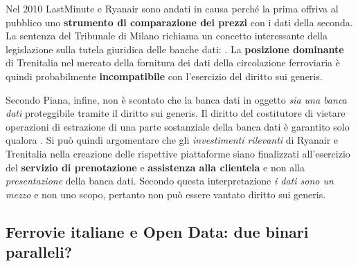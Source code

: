 \documentclass[12pt,a4paper,italian]{report}
\begin{document}
Nel 2010 LastMinute e Ryanair sono andati in causa perché la prima
offriva al pubblico uno \textbf{strumento di comparazione dei prezzi}
con i dati della seconda.  La sentenza \cite{RyanairSentenza} del
Tribunale di Milano richiama un concetto interessante della
legislazione sulla tutela giuridica delle banche dati:
.  La
\textbf{posizione dominante} di Trenitalia nel mercato della fornitura
dei dati della circolazione ferroviaria è quindi probabilmente
\textbf{incompatibile} con l'esercizio del diritto sui generis.

Secondo Piana, infine, non è scontato che la banca dati in oggetto
\textit{sia una banca dati} proteggibile tramite il diritto sui
generis.  Il diritto del costitutore di vietare operazioni di
estrazione di una parte sostanziale della banca dati è garantito solo
qualora .  Si può quindi argomentare che gli
\textit{investimenti rilevanti} di Ryanair e Trenitalia nella
creazione delle rispettive piattaforme siano finalizzati all'esercizio
del \textbf{servizio di prenotazione} e \textbf{assistenza alla
    clientela} e non alla \textit{presentazione} della banca dati.
Secondo questa interpretazione \textit{i dati sono un mezzo} e non uno
scopo, pertanto non può essere vantato diritto sui generis.

\subsection{Ferrovie italiane e Open Data: due binari paralleli?}
\end{document}
